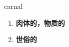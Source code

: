 
\begin{frame}
{\huge carnal}
\begin{center}
\begin{enumerate}\Large
  \item \textbf{肉体的，物质的}
  \item \textbf{世俗的}
\end{enumerate}
\end{center}
\end{frame}
